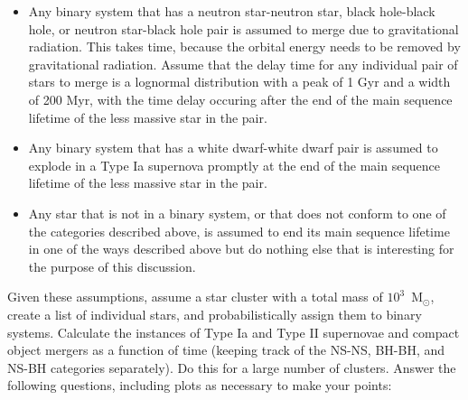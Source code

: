 \documentclass[10pt]{article}
\begin{document}
\begin{itemize}
  \item Any binary system that has a neutron star-neutron star, black
    hole-black hole, or neutron star-black hole pair is assumed to
    merge due to gravitational radiation.  This takes time, because
    the orbital energy needs to be removed by gravitational
    radiation.  Assume that the delay time for any individual pair
    of stars to merge is a lognormal distribution with a peak of 1 Gyr
    and a width of 200 Myr, with the time delay occuring after the end of the
    main sequence lifetime of the less massive star in the pair.

  \item Any binary system that has a white dwarf-white dwarf pair is
    assumed to explode in a Type Ia supernova promptly at the end of
    the main sequence lifetime of the less massive star in the pair.

  \item Any star that is not in a binary system, or that does not
    conform to one of the categories described above, is assumed to
    end its main sequence lifetime in one of the ways described above
    but do nothing else that is interesting for the purpose of this discussion.
  
  \end{itemize}

\newpage
Given these assumptions, assume a star cluster with a total mass of
$10^3$~M$_\odot$, create a list of individual stars, and
probabilistically assign them
to binary systems.   Calculate the instances of Type Ia and Type II
supernovae and compact object mergers as a function of time (keeping
track of the NS-NS, BH-BH, and NS-BH categories separately).  Do this
for a large number of clusters.  Answer the following questions,
including plots as necessary to make your points:
\end{document}
